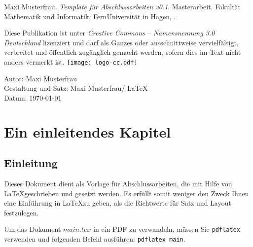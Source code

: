 \documentclass[twoside,bibliography=totoc,openany]{fumi}
\newcommand{\thesistitle}{Template für Abschlussarbeiten v0.1}
\newcommand{\thesisauthor}{Maxi Musterfrau}
\newcommand{\thesistype}{Masterarbeit} %
\begin{document}
{\small

\thesisauthor. \textit{\thesistitle}. \thesistype. Fakultät Mathematik und Informatik, FernUniversität in Hagen, \the\year. %
\\\vfill

Diese Publikation ist unter \emph{Creative Commons -- Namensnennung 3.0 Deutschland} lizenziert und darf als Ganzes oder ausschnittweise vervielfältigt, verbreitet und öffentlich zugänglich gemacht werden, sofern dies im Text nicht anders vermerkt ist.\newline\vspace{10pt}
\hspace{-9pt}\texttt{[image: logo-cc.pdf]}
\\\vspace{10pt}

Autor: \thesisauthor\\
Gestaltung und Satz: \thesisauthor / \LaTeX\\
Datum: \today\\
\cleardoublepage
}

\pagestyle{headings}
\tableofcontents


\chapter{Ein einleitendes Kapitel}

\section{Einleitung}
Dieses Dokument dient als Vorlage für Abschlussarbeiten, die mit Hilfe von \LaTeX geschrieben und gesetzt werden. Es erfüllt somit weniger den Zweck Ihnen eine Einführung in \LaTeX zu geben, als die Richtwerte für Satz und Layout festzulegen. 

Um das Dokument $main.tex$ in ein PDF zu verwandeln, müssen Sie \texttt{pdflatex} verwenden und folgenden Befehl ausführen: \texttt{pdflatex main}. 
\end{document}
